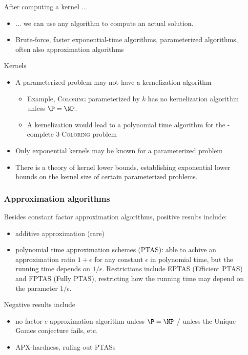 \begin{frame}{After computing a kernel ...}
 \begin{itemize}
  \item ... we can use any algorithm to compute an actual solution.
  \item Brute-force, faster exponential-time algorithms, parameterized algorithms, often also approximation algorithms
 \end{itemize}
\end{frame}


\begin{frame}{Kernels}
\begin{itemize}
 \item A parameterized problem may not have a kernelization algorithm
 \begin{itemize}
  \item Example, \textsc{Coloring} parameterized by $k$ has no kernelization algorithm unless $\P = \NP$. 
  \item A kernelization would lead to a polynomial time algorithm for the \NP-complete 3-\textsc{Coloring} problem
 \end{itemize}
 \item Only exponential kernels may be known for a parameterized problem
 \item There is a theory of kernel lower bounds, establishing exponential lower bounds on the kernel size of certain parameterized problems.
\end{itemize}
\end{frame}

\begin{frame}
	\frametitle{Approximation algorithms}
	
	Besides constant factor approximation algorithms, positive results include:
	\begin{itemize}
		\item additive approximation (rare)
		\item polynomial time approximation schemes (PTAS): able to achive an approximation ratio $1+\epsilon$ for any constant $\epsilon$ in polynomial time, but the running time depends on $1/\epsilon$. Restrictions include EPTAS (Efficient PTAS) and FPTAS (Fully PTAS), restricting how the running time may depend on the parameter $1/\epsilon$.
	\end{itemize}
	Negative results include
	\begin{itemize}
		\item no factor-$c$ approximation algorithm unless $\P = \NP$ / unless the Unique Games conjecture fails, etc.
		\item APX-hardness, ruling out PTASs
	\end{itemize}
\end{frame}


